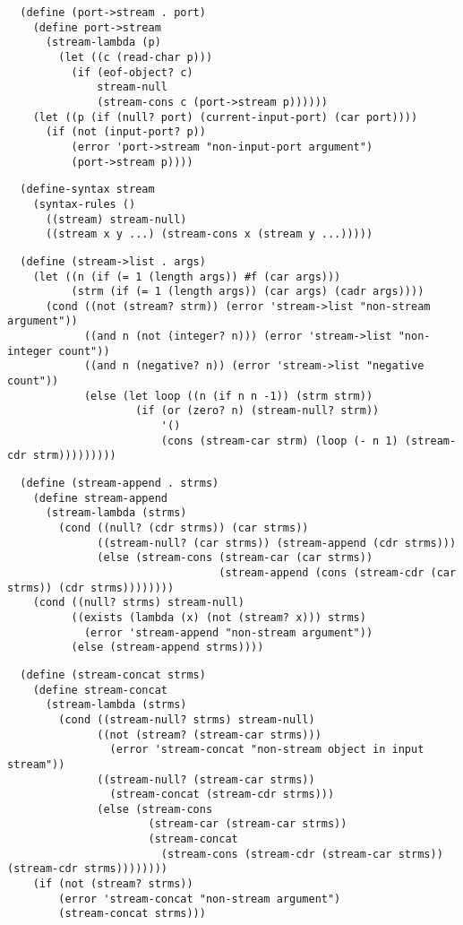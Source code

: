 \begin{verbatim}
  (define (port->stream . port)
    (define port->stream
      (stream-lambda (p)
        (let ((c (read-char p)))
          (if (eof-object? c)
              stream-null
              (stream-cons c (port->stream p))))))
    (let ((p (if (null? port) (current-input-port) (car port))))
      (if (not (input-port? p))
          (error 'port->stream "non-input-port argument")
          (port->stream p))))
\end{verbatim}

\begin{verbatim}
  (define-syntax stream
    (syntax-rules ()
      ((stream) stream-null)
      ((stream x y ...) (stream-cons x (stream y ...)))))
\end{verbatim}

\begin{verbatim}
  (define (stream->list . args)
    (let ((n (if (= 1 (length args)) #f (car args)))
          (strm (if (= 1 (length args)) (car args) (cadr args))))
      (cond ((not (stream? strm)) (error 'stream->list "non-stream argument"))
            ((and n (not (integer? n))) (error 'stream->list "non-integer count"))
            ((and n (negative? n)) (error 'stream->list "negative count"))
            (else (let loop ((n (if n n -1)) (strm strm))
                    (if (or (zero? n) (stream-null? strm))
                        '()
                        (cons (stream-car strm) (loop (- n 1) (stream-cdr strm)))))))))
\end{verbatim}

\begin{verbatim}
  (define (stream-append . strms)
    (define stream-append
      (stream-lambda (strms)
        (cond ((null? (cdr strms)) (car strms))
              ((stream-null? (car strms)) (stream-append (cdr strms)))
              (else (stream-cons (stream-car (car strms))
                                 (stream-append (cons (stream-cdr (car strms)) (cdr strms))))))))
    (cond ((null? strms) stream-null)
          ((exists (lambda (x) (not (stream? x))) strms)
            (error 'stream-append "non-stream argument"))
          (else (stream-append strms))))
\end{verbatim}

\begin{verbatim}
  (define (stream-concat strms)
    (define stream-concat
      (stream-lambda (strms)
        (cond ((stream-null? strms) stream-null)
              ((not (stream? (stream-car strms)))
                (error 'stream-concat "non-stream object in input stream"))
              ((stream-null? (stream-car strms))
                (stream-concat (stream-cdr strms)))
              (else (stream-cons
                      (stream-car (stream-car strms))
                      (stream-concat
                        (stream-cons (stream-cdr (stream-car strms)) (stream-cdr strms))))))))
    (if (not (stream? strms))
        (error 'stream-concat "non-stream argument")
        (stream-concat strms)))
\end{verbatim}

